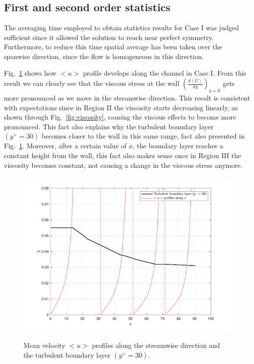 \documentclass[twocolumn,10pt]{asme2e}
\begin{document}
\subsection*{First and second order statistics}

The averaging time employed to obtain statistics results for Case I was judged sufficient since it allowed the solution to reach near perfect symmetry. Furthermore, to reduce this time spatial average has been taken over the spanwise direction, since the flow is homogeneous in this direction.

Fig.~\ref{fig:u_CI}  shows how \(<u>\) profile develops along the channel in Case I. From this result we can clearly see that the viscous stress at the wall \(\left(\frac{d\left<U\right>}{dy}\right)_{y=0}\) gets more pronounced as we move in the streamwise direction. This result is consistent with expectations since in Region II the viscosity starts decreasing linearly, as shown through Fig.~\ref{fig:viscosity}, causing the viscous effects to become more pronounced. This fact also explains why the turbulent boundary layer \((y^+=30)\) becomes closer to the wall in this same range, fact also presented in Fig.~\ref{fig:u_CI}. Moreover, after a certain value of \(x\), the boundary layer reaches a constant height from the wall, this fact also makes sense once in Region III the viscosity becomes constant, not causing a change in the viscous stress anymore.

\begin{figure}[t]
\centering
\scalebox{0.5}
{\includegraphics{u_CI.pdf}}
\caption{Mean velocity \(<u>\) profiles along the streamwise direction and the turbulent boundary layer \((y^+=30)\).}
\label{fig:u_CI}
\end{figure}
\end{document}
